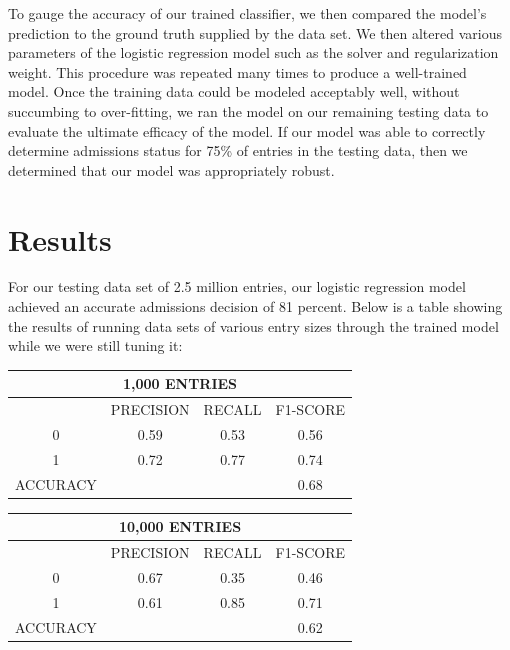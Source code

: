 \documentclass{article}
\begin{document}
To gauge the accuracy of our trained classifier, we then compared the model's prediction to the ground truth supplied by the data set. We then altered various parameters of the logistic regression model such as the solver and regularization weight. This procedure was repeated many times to produce a well-trained model. \newline
Once the training data could be modeled acceptably well, without succumbing to over-fitting, we ran the model on our remaining testing data to evaluate the ultimate efficacy of the model. If our model was able to correctly determine admissions status for 75\% of entries in the testing data, then we determined that our model was appropriately robust. \newline \newline 
\section{Results}
For our testing data set of 2.5 million entries, our logistic regression model achieved an accurate admissions decision of 81 percent. Below is a table showing the results of running data sets of various entry sizes through the trained model while we were still tuning it: \newline
\begin{center}
    \begin{tabular}{ |c|c|c|c| }
    \hline
    \multicolumn{4}{|c|}{1,000 ENTRIES} \\
    \hline
    \hline
    & PRECISION & RECALL & F1-SCORE \\
    \hline
    0 & 0.59 & 0.53 & 0.56 \\
    \hline
    1 & 0.72 & 0.77 & 0.74 \\
    \hline
    \hline
    ACCURACY & & & 0.68 \\
    \hline
    \end{tabular}
\end{center}

\begin{center}
    \begin{tabular}{ |c|c|c|c| }
    \hline
    \multicolumn{4}{|c|}{10,000 ENTRIES} \\
    \hline
    \hline
    & PRECISION & RECALL & F1-SCORE \\
    \hline
    0 & 0.67 & 0.35 & 0.46 \\
    \hline
    1 & 0.61 & 0.85 & 0.71 \\
    \hline
    \hline
    ACCURACY & & & 0.62 \\
    \hline
    \end{tabular}
\end{center}
\end{document}
